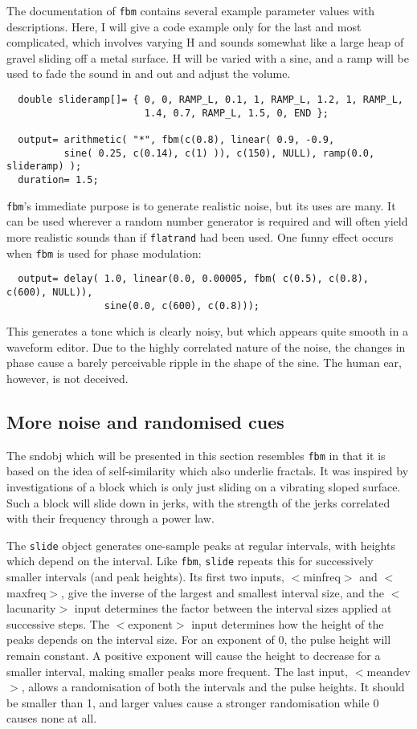 \documentclass{article}
\def\bv{\begin{verbatim}}
\begin{document}
The documentation of {\tt fbm} contains several example parameter values with
descriptions.  Here, I will give a code example only for the last and most
complicated, which involves varying H and sounds somewhat like a large heap of
gravel sliding off a metal surface.  H will be varied with a sine, and a ramp
will be used to fade the sound in and out and adjust the volume.

\bv
  double slideramp[]= { 0, 0, RAMP_L, 0.1, 1, RAMP_L, 1.2, 1, RAMP_L, 
                        1.4, 0.7, RAMP_L, 1.5, 0, END };

  output= arithmetic( "*", fbm(c(0.8), linear( 0.9, -0.9,
          sine( 0.25, c(0.14), c(1) )), c(150), NULL), ramp(0.0, slideramp) );
  duration= 1.5;
\end{verbatim}

{\tt fbm}'s immediate purpose is to generate realistic noise, but its uses are
many.  It can be used wherever a random number generator is required and will
often yield more realistic sounds than if {\tt flatrand} had been used.  One
funny effect occurs when {\tt fbm} is used for phase modulation:

\bv
  output= delay( 1.0, linear(0.0, 0.00005, fbm( c(0.5), c(0.8), c(600), NULL)),
                 sine(0.0, c(600), c(0.8)));
\end{verbatim}

This generates a tone which is clearly noisy, but which appears quite smooth in
a waveform editor.  Due to the highly correlated nature of the noise, the
changes in phase cause a barely perceivable ripple in the shape of the sine.
The human ear, however, is not deceived.


\subsection{More noise and randomised cues}

The sndobj which will be presented in this section resembles {\tt fbm} in that
it is based on the idea of self-similarity which also underlie fractals.  It
was inspired by investigations of a block which is only just sliding on a
vibrating sloped surface.  Such a block will slide down in jerks, with the
strength of the jerks correlated with their frequency through a power law.

The {\tt slide} object generates one-sample peaks at regular intervals, with
heights which depend on the interval.  Like {\tt fbm}, {\tt slide} repeats this
for successively smaller intervals (and peak heights).  Its first two inputs,
$<$minfreq$>$ and $<$maxfreq$>$, give the inverse of the largest and smallest
interval size, and the $<$lacunarity$>$ input determines the factor between the
interval sizes applied at successive steps.  The $<$exponent$>$ input
determines how the height of the peaks depends on the interval size.  For an
exponent of 0, the pulse height will remain constant.  A positive exponent will
cause the height to decrease for a smaller interval, making smaller peaks more
frequent.  The last input, $<$meandev$>$, allows a randomisation of both the
intervals and the pulse heights.  It should be smaller than 1, and larger
values cause a stronger randomisation while 0 causes none at all.
\end{document}
